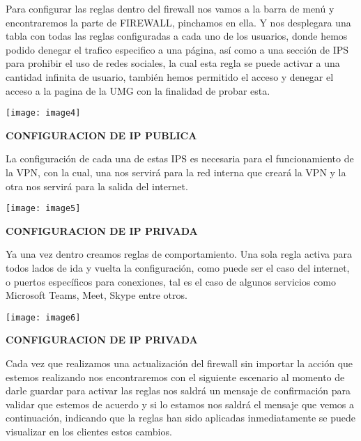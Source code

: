 \noindent Para configurar las reglas dentro del firewall nos vamos a la barra de men\'{u} y encontraremos la parte de FIREWALL, pinchamos en ella. Y nos desplegara una tabla con todas las reglas configuradas a cada uno de los usuarios, donde hemos podido denegar el trafico especifico a una p\'{a}gina, as\'{i} como a una secci\'{o}n de IPS para prohibir el uso de redes sociales, la cual esta regla se puede activar a una cantidad infinita de usuario, tambi\'{e}n hemos permitido el acceso y denegar el acceso a la pagina de la UMG con la finalidad de probar esta.

\noindent \texttt{[image: image4]}

\noindent 

\noindent \textbf{CONFIGURACION DE IP PUBLICA}

\noindent La configuraci\'{o}n de cada una de estas IPS es necesaria para el funcionamiento de la VPN, con la cual, una nos servir\'{a} para la red interna que crear\'{a} la VPN y la otra nos servir\'{a} para la salida del internet.

\noindent 

\noindent \texttt{[image: image5]}

\noindent \textbf{}

\noindent \textbf{}

\noindent \textbf{CONFIGURACION DE IP PRIVADA}

\noindent Ya una vez dentro creamos reglas de comportamiento. Una sola regla activa para todos lados de ida y vuelta la configuraci\'{o}n, como puede ser el caso del internet, o puertos espec\'{i}ficos para conexiones, tal es el caso de algunos servicios como Microsoft Teams, Meet, Skype entre otros.  

\noindent 

\noindent \texttt{[image: image6]}

\noindent 

\noindent \textbf{CONFIGURACION DE IP PRIVADA}

\noindent Cada vez que realizamos una actualizaci\'{o}n del firewall sin importar la acci\'{o}n que estemos realizando nos encontraremos con el siguiente escenario al momento de darle guardar para activar las reglas nos saldr\'{a} un mensaje de confirmaci\'{o}n para validar que estemos de acuerdo y si lo estamos nos saldr\'{a} el mensaje que vemos a continuaci\'{o}n, indicando que la reglas han sido aplicadas inmediatamente se puede visualizar en los clientes estos cambios.

